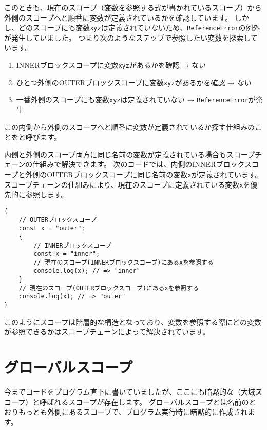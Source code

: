 このときも、現在のスコープ（変数を参照する式が書かれているスコープ）から外側のスコープへと順番に変数が定義されているかを確認しています。
しかし、どのスコープにも変数\texttt{xyz}は定義されていないため、\texttt{ReferenceError}の例外が発生していました。
つまり次のようなステップで参照したい変数を探索しています。

\begin{enumerate}
\def\labelenumi{\arabic{enumi}.}
\item
  INNERブロックスコープに変数\texttt{xyz}があるかを確認 → ない
\item
  ひとつ外側のOUTERブロックスコープに変数\texttt{xyz}があるかを確認 → ない
\item
  一番外側のスコープにも変数\texttt{xyz}は定義されていない → \texttt{ReferenceError}が発生
\end{enumerate}

この内側から外側のスコープへと順番に変数が定義されているか探す仕組みのことを\textbf{}と呼びます。

内側と外側のスコープ両方に同じ名前の変数が定義されている場合もスコープチェーンの仕組みで解決できます。
次のコードでは、内側のINNERブロックスコープと外側のOUTERブロックスコープに同じ名前の変数\texttt{x}が定義されています。
スコープチェーンの仕組みにより、現在のスコープに定義されている変数\texttt{x}を優先的に参照します。

\begin{lstlisting}
{
    // OUTERブロックスコープ
    const x = "outer";
    {
        // INNERブロックスコープ
        const x = "inner";
        // 現在のスコープ(INNERブロックスコープ)にあるxを参照する
        console.log(x); // => "inner"
    }
    // 現在のスコープ(OUTERブロックスコープ)にあるxを参照する
    console.log(x); // => "outer"
}
\end{lstlisting}

このようにスコープは階層的な構造となっており、変数を参照する際にどの変数が参照できるかはスコープチェーンによって解決されています。

\hypertarget{global-scope}{%
\section{グローバルスコープ}\label{global-scope}}

今までコードをプログラム直下に書いていましたが、ここにも暗黙的な\textbf{}（大域スコープ）と呼ばれるスコープが存在します。
グローバルスコープとは名前のとおりもっとも外側にあるスコープで、プログラム実行時に暗黙的に作成されます。

